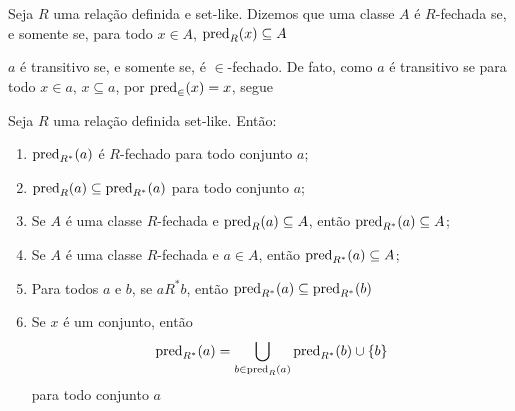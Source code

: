 \begin{definition}
    Seja $R$ uma relação definida e set-like. Dizemos que uma classe $A$ é $R$-fechada se, e somente se, para todo $x \in A$, $\operatorname{pred}_R(x) \subseteq A$
\end{definition}

\begin{example}
    $a$ é transitivo se, e somente se, é $\in$-fechado. De fato, como $a$ é transitivo se para todo $x\in a$, $x \subseteq a$, por $\operatorname{pred}_\in(x) = x$, segue
\end{example}

\begin{lemma}
    Seja $R$ uma relação definida set-like. Então:
    \begin{enumerate}[label=\alph*)]
        \item $\operatorname{pred}_{R^*}(a)$ é $R$-fechado para todo conjunto $a$;
        \item $\operatorname{pred}_R(a) \subseteq \operatorname{pred}_{R^*}(a)$ para todo conjunto $a$;
        \item Se $A$ é uma classe $R$-fechada e $\operatorname{pred}_R(a) \subseteq A$, então $\operatorname{pred}_{R^*}(a) \subseteq A$;
        \item Se $A$ é uma classe $R$-fechada e $a\in A$, então $\operatorname{pred}_{R^*}(a)\subseteq A$;
        \item Para todos $a$ e $b$, se $aR^* b$, então $\operatorname{pred}_{R^*}(a) \subseteq \operatorname{pred}_{R^*}(b)$
        \item Se $x$ é um conjunto, então $$\operatorname{pred}_{R^*}(a) = \bigcup_{b\in \operatorname{pred}_R(a)} \operatorname{pred}_{R^*}(b)\cup\left\{ b \right\}$$ para todo conjunto $a$
    \end{enumerate}
\end{lemma}
